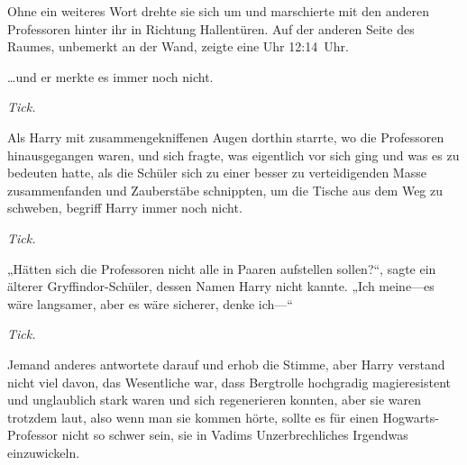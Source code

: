 
Ohne ein weiteres Wort drehte sie sich um und marschierte mit den anderen Professoren hinter ihr in Richtung Hallentüren. Auf der anderen Seite des Raumes, unbemerkt an der Wand, zeigte eine Uhr 12:14~Uhr.

\later

…und er merkte es immer noch nicht.

\emph{Tick.}

Als Harry mit zusammengekniffenen Augen dorthin starrte, wo die Professoren hinausgegangen waren, und sich fragte, was eigentlich vor sich ging und was es zu bedeuten hatte, als die Schüler sich zu einer besser zu verteidigenden Masse zusammenfanden und Zauberstäbe schnippten, um die Tische aus dem Weg zu schweben, begriff Harry immer noch nicht.

\emph{Tick.}

„Hätten sich die Professoren nicht alle in Paaren aufstellen sollen?“, sagte ein älterer Gryffindor-Schüler, dessen Namen Harry nicht kannte. „Ich meine—es wäre langsamer, aber es wäre sicherer, denke ich—“

\emph{Tick.}

Jemand anderes antwortete darauf und erhob die Stimme, aber Harry verstand nicht viel davon, das Wesentliche war, dass Bergtrolle hochgradig magieresistent und unglaublich stark waren und sich regenerieren konnten, aber sie waren trotzdem laut, also wenn man sie kommen hörte, sollte es für einen Hogwarts-Professor nicht so schwer sein, sie in Vadims Unzerbrechliches Irgendwas einzuwickeln.

